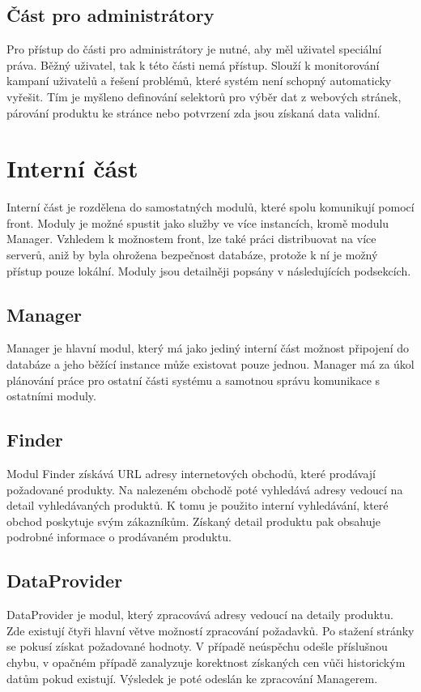 \documentclass[thesis=B,czech]{FITthesis}[2012/06/26]
\begin{document}
\subsection{Část pro administrátory}
Pro přístup do části pro administrátory je nutné, aby měl uživatel speciální práva. Běžný uživatel, tak k této části nemá přístup. Slouží k monitorování kampaní uživatelů a řešení problémů, které systém není schopný 
automaticky vyřešit. Tím je myšleno definování selektorů pro výběr dat z webových stránek, párování produktu ke stránce 
nebo potvrzení zda jsou získaná data validní.

\section{Interní část}
Interní část je rozdělena do samostatných modulů, které spolu komunikují pomocí front. Moduly je možné spustit jako služby ve více 
instancích, kromě modulu Manager. Vzhledem k možnostem front, lze také práci distribuovat na více serverů, aniž by byla ohrožena 
bezpečnost databáze, protože k ní je možný přístup pouze lokální. Moduly jsou detailněji popsány v následujících podsekcích.
\subsection{Manager}
Manager je hlavní modul, který má jako jediný interní část možnost připojení do databáze a jeho běžící instance může existovat pouze jednou.
Manager má za úkol plánování práce pro ostatní části systému a samotnou správu komunikace s ostatními moduly.
\subsection{Finder}
Modul Finder získává URL adresy internetových obchodů, které prodávají požadované produkty.
Na nalezeném obchodě poté vyhledává adresy vedoucí na detail vyhledávaných produktů. K tomu je použito interní vyhledávání, které
obchod poskytuje svým zákazníkům. Získaný detail produktu pak obsahuje podrobné informace o prodávaném produktu.

\subsection{DataProvider}
DataProvider je modul, který zpracovává adresy vedoucí na detaily produktu. Zde existují čtyři hlavní větve možností zpracování požadavků.
Po stažení stránky se pokusí získat požadované
hodnoty. V případě neúspěchu odešle příslušnou chybu, v opačném případě zanalyzuje korektnost získaných cen vůči historickým datům pokud
existují. Výsledek je poté odeslán ke zpracování Managerem.
\end{document}
